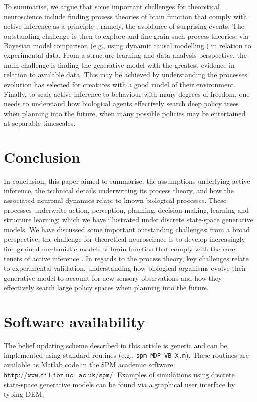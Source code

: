 \documentclass[review,12pt,authoryear]{elsarticle}
\begin{document}
To summarise, we argue that some important challenges for theoretical neuroscience include finding process theories of brain function that comply with active inference as a principle \citep{parrMarkovBlanketsInformation2019,fristonFreeEnergyPrinciple2019}; namely, the avoidance of surprising events. The outstanding challenge is then to explore and fine grain such process theories, via Bayesian model comparison (e.g., using dynamic causal modelling \citep{fristonDynamicCausalModelling2003,fristonHistoryFutureBayesian2012}) in relation to experimental data. From a structure learning and data analysis perspective, the main challenge is finding the generative model with the greatest evidence in relation to available data. This may be achieved by understanding the processes evolution has selected for creatures with a good model of their environment. Finally, to scale active inference to behaviour with many degrees of freedom, one needs to understand how biological agents effectively search deep policy trees when planning into the future, when many possible policies may be entertained at separable timescales.

\section{Conclusion}

In conclusion, this paper aimed to summarise: the assumptions underlying active inference, the technical details underwriting its process theory, and how the associated neuronal dynamics relate to known biological processes. These processes underwrite action, perception, planning, decision-making, learning and structure learning; which we have illustrated under discrete state-space generative models. We have discussed some important outstanding challenges: from a broad perspective, the challenge for theoretical neuroscience is to develop increasingly fine-grained mechanistic models of brain function that comply with the core tenets of active inference \citep{parrMarkovBlanketsInformation2019,fristonFreeEnergyPrinciple2019}. In regards to the process theory, key challenges relate to experimental validation, understanding how biological organisms evolve their generative model to account for new sensory observations and how they effectively search large policy spaces when planning into the future.

\section*{Software availability}
The belief updating scheme described in this article is generic and can be implemented using standard routines (e.g., \texttt{spm\_MDP\_VB\_X.m}). These routines are available as Matlab code in the SPM academic software: $\texttt{http://www.fil.ion.ucl.ac.uk/spm/}$. Examples of simulations using discrete state-space generative models can be found via a graphical user interface by typing DEM.
\end{document}
